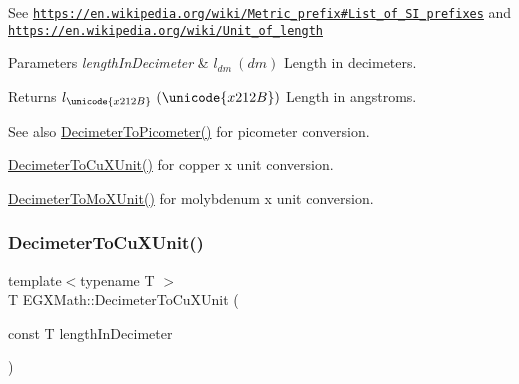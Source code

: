 See \href{https://en.wikipedia.org/wiki/Metric_prefix#List_of_SI_prefixes}{\tt https\+://en.\+wikipedia.\+org/wiki/\+Metric\+\_\+prefix\#\+List\+\_\+of\+\_\+\+S\+I\+\_\+prefixes} and \href{https://en.wikipedia.org/wiki/Unit_of_length}{\tt https\+://en.\+wikipedia.\+org/wiki/\+Unit\+\_\+of\+\_\+length} 
\begin{DoxyParams}{Parameters}
{\em length\+In\+Decimeter} & $ l_{dm}\ (dm)$ Length in decimeters. \\
\hline
\end{DoxyParams}
\begin{DoxyReturn}{Returns}
$ l_{\unicode{x212B}}\ (\unicode{x212B})$ Length in angstroms. 
\end{DoxyReturn}
\begin{DoxySeeAlso}{See also}
\mbox{\hyperlink{group___e_g_x_math-_conversions-_length_conversions-_s_i-_decimeter-_s_i_gaac5fa4b7b538abe2d19f33e131e9bbde}{Decimeter\+To\+Picometer()}} for picometer conversion. 

\mbox{\hyperlink{group___e_g_x_math-_conversions-_length_conversions-_s_i-_decimeter-_non-_s_i_gab595b2398e8e838922b4591308466e87}{Decimeter\+To\+Cu\+X\+Unit()}} for copper x unit conversion. 

\mbox{\hyperlink{group___e_g_x_math-_conversions-_length_conversions-_s_i-_decimeter-_non-_s_i_ga609f53e09c9a767639da3ad72905bb71}{Decimeter\+To\+Mo\+X\+Unit()}} for molybdenum x unit conversion. 
\end{DoxySeeAlso}
\mbox{\label{group___e_g_x_math-_conversions-_length_conversions-_s_i-_decimeter-_non-_s_i_gab595b2398e8e838922b4591308466e87}} 
\subsubsection{\texorpdfstring{Decimeter\+To\+Cu\+X\+Unit()}{DecimeterToCuXUnit()}}
{\footnotesize\ttfamily template$<$typename T $>$ \\
T E\+G\+X\+Math\+::\+Decimeter\+To\+Cu\+X\+Unit (\begin{DoxyParamCaption}\item[{const T}]{length\+In\+Decimeter }\end{DoxyParamCaption})}



